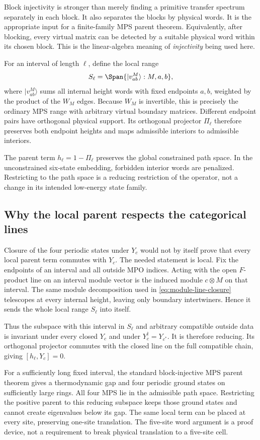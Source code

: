 Block injectivity is stronger than merely finding a primitive
transfer spectrum separately in each block. It also separates the
blocks by physical words. It is the appropriate input for a
finite-family MPS parent theorem.
Equivalently, after blocking, every virtual matrix can be detected
by a suitable physical word within its chosen block. This is the
linear-algebra meaning of \emph{injectivity} being used here.

For an interval of length $\ell$, define the local range
\[
 S_\ell=\Span\{|v^M_{ab}\rangle:M,a,b\},
\]
where $|v^M_{ab}\rangle$ sums all internal height words with fixed
endpoints $a,b$, weighted by the product of the $W_M$ edges. Because
$W_M$ is invertible, this is precisely the ordinary MPS range with
arbitrary virtual boundary matrices. Different endpoint pairs have
orthogonal physical support. Its orthogonal projector $\Pi_\ell$
therefore preserves both endpoint heights and maps admissible
interiors to admissible interiors.

The parent term $h_\ell=1-\Pi_\ell$ preserves the global constrained
path space. In the unconstrained six-state embedding, forbidden
interior words are penalized. Restricting to the path space is a
reducing restriction of the operator, not a change in its intended
low-energy state family.

\subsection{Why the local parent respects the categorical lines}

Closure of the four periodic states under $Y_c$ would not by itself
prove that every local parent term commutes with $Y_c$. The needed
statement is local. Fix the endpoints of an interval and all outside
MPO indices. Acting with the open $F$-product line on an interval
module vector is the induced module $c\otimes M$ on that interval.
The same module decomposition used in
\eqref{eq:module-line-closure} telescopes at every internal height,
leaving only boundary intertwiners. Hence it sends the whole local
range $S_\ell$ into itself.

Thus the subspace with this interval in $S_\ell$ and arbitrary
compatible outside data is invariant under every closed $Y_c$ and
under $Y_c^\dagger=Y_{c^*}$. It is therefore reducing. Its
orthogonal projector commutes with the closed line on the full
compatible chain, giving $[h_\ell,Y_c]=0$.

For a sufficiently long fixed interval, the standard block-injective
MPS parent theorem gives a thermodynamic gap and four periodic
ground states on sufficiently large rings. All four MPS lie in the
admissible path space. Restricting the positive parent to this
reducing subspace keeps those ground states and cannot create
eigenvalues below its gap. The same local term can
be placed at every site, preserving one-site translation. The
five-site word argument is a proof device, not a requirement to
break physical translation to a five-site cell.

